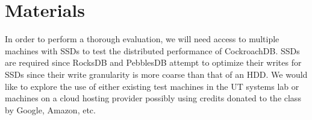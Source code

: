 \documentclass[10pt,twocolumn,letterpaper]{article}
\begin{document}
\section{Materials}
In order to perform a thorough evaluation, we will need access to multiple machines with SSDs to test the distributed performance of CockroachDB. SSDs are required since RocksDB and PebblesDB attempt to optimize their writes for SSDs since their write granularity is more coarse than that of an HDD. We would like to explore the use of either existing test machines in the UT systems lab or machines on a cloud hosting provider possibly using credits donated to the class by Google, Amazon, etc.

\end{document}
